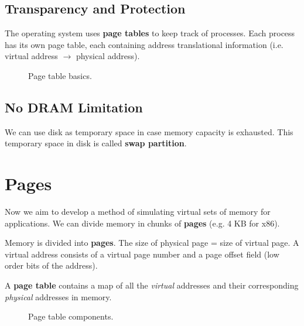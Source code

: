 \subsection{Transparency and Protection}
The operating system uses \textbf{page tables} to keep track of processes. Each process has its own page table, each containing address translational information (i.e. virtual address \(\to\) physical address).

\begin{figure}[H]
  \centering
  \caption{Page table basics.}
  \label{fig:ptbasics}
\end{figure}

\subsection{No DRAM Limitation}
We can use disk as temporary space in case memory capacity is exhausted. This temporary space in disk is called \textbf{swap partition}.

\section{Pages}
Now we aim to develop a method of simulating virtual sets of memory for applications. We can divide memory in chunks of \textbf{pages} (e.g. 4 KB for x86).

\begin{definition}[Page]
  Memory is divided into \textbf{pages}. The size of physical page = size of virtual page. A virtual address consists of a virtual page number and a page offset field (low order bits of the address).
\end{definition}

\begin{definition}
  A \textbf{page table} contains a map of all the \emph{virtual} addresses and their corresponding \emph{physical} addresses in memory. 
\end{definition}

\begin{figure}[H]
  \centering
  \caption{Page table components.}
  \label{fig:pagetablecomp}
\end{figure}


